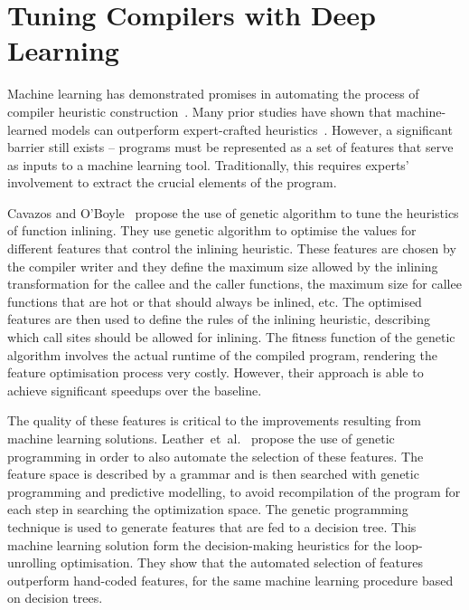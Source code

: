 
\section{Tuning Compilers with Deep Learning}



Machine learning has demonstrated promises in automating the process of compiler heuristic construction~\cite{wang18}.
Many prior studies have shown that machine-learned models can outperform expert-crafted heuristics~\cite{cavazos05,leather09, wang14, mendis19}.
However, a significant barrier still exists -- programs must be represented as a set of features that serve as inputs to a machine learning tool.
Traditionally, this requires experts' involvement to extract the crucial elements of the program. 


Cavazos and O'Boyle~\cite{cavazos05} propose the use of genetic algorithm to tune the heuristics of function inlining.
They use genetic algorithm to optimise the values for different features that control the inlining heuristic.
These features are chosen by the compiler writer and they define the maximum size allowed by the inlining transformation for the callee and the caller functions, the maximum size for callee functions that are hot or that should always be inlined, etc.
The optimised features are then used to define the rules of the inlining heuristic, describing which call sites should be allowed for inlining.
The fitness function of the genetic algorithm involves the actual runtime of the compiled program, rendering the feature optimisation process very costly.
However, their approach is able to achieve significant speedups over the baseline.

The quality of these features is critical to the improvements resulting from machine learning solutions.
Leather~et~al.~\cite{leather09} propose the use of genetic programming in order to also automate the selection of these features.
The feature space is described by a grammar and is then searched with genetic programming and predictive modelling, to avoid recompilation of the program for each step in searching the optimization space.
The genetic programming technique is used to generate features that are fed to a decision tree.
This machine learning solution form the decision-making heuristics for the loop-unrolling optimisation.
They show that the automated selection of features outperform hand-coded features, for the same machine learning procedure based on decision trees.


